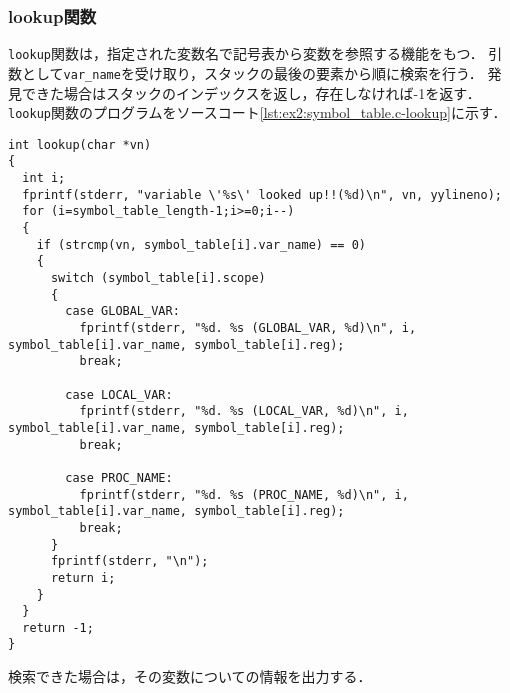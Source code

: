 \documentclass[uplatex]{jsarticle}
\begin{document}
\subsubsection{lookup関数}
\verb#lookup#関数は，指定された変数名で記号表から変数を参照する機能をもつ．
引数として\verb#var_name#を受け取り，スタックの最後の要素から順に検索を行う．
発見できた場合はスタックのインデックスを返し，存在しなければ-1を返す．
\verb#lookup#関数のプログラムをソースコート\ref{lst:ex2:symbol_table.c-lookup}に示す．

\begin{lstlisting}[caption=lookup関数,label=lst:ex2:symbol_table.c-lookup]
int lookup(char *vn)
{
  int i;
  fprintf(stderr, "variable \'%s\' looked up!!(%d)\n", vn, yylineno);
  for (i=symbol_table_length-1;i>=0;i--)
  {
    if (strcmp(vn, symbol_table[i].var_name) == 0)
    {
      switch (symbol_table[i].scope)
      {
        case GLOBAL_VAR:
          fprintf(stderr, "%d. %s (GLOBAL_VAR, %d)\n", i, symbol_table[i].var_name, symbol_table[i].reg);
          break;

        case LOCAL_VAR:
          fprintf(stderr, "%d. %s (LOCAL_VAR, %d)\n", i, symbol_table[i].var_name, symbol_table[i].reg);
          break;

        case PROC_NAME:
          fprintf(stderr, "%d. %s (PROC_NAME, %d)\n", i, symbol_table[i].var_name, symbol_table[i].reg);
          break;
      }
      fprintf(stderr, "\n");
      return i;
    }
  }
  return -1;
}
\end{lstlisting}
検索できた場合は，その変数についての情報を出力する．
\end{document}
